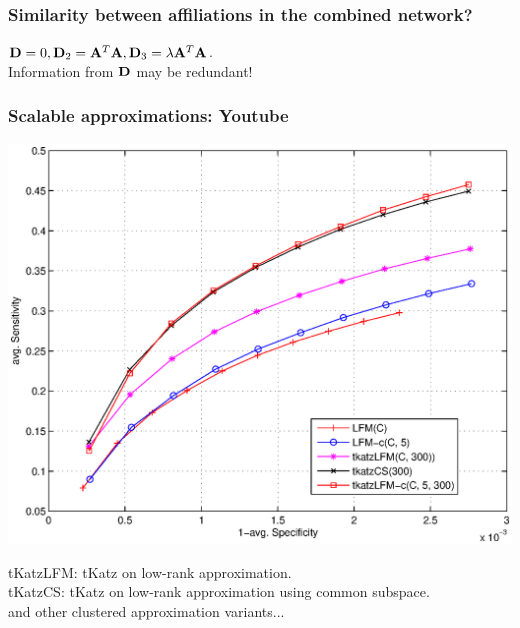 \documentclass[handout]{beamer}
\begin{document}
\begin{frame}
\frametitle{Similarity between affiliations in the combined network?}
\pause
{}
\pause
$\mathbf{D} = 0, \mathbf{D}_{2} = \mathbf{A}^{T}\mathbf{A}, \mathbf{D}_{3} = \lambda \mathbf{A}^{T}\mathbf{A}$. \\
\pause
Information from $\mathbf{D}$ may be redundant!
\end{frame}

\begin{frame}
\frametitle{Scalable approximations: Youtube}
\begin{center}
\includegraphics[scale=0.4]{../journalPaper/summarySVDKatzYoutube.eps}
\end{center}
\pause
\textsf{tKatzLFM}: \textsf{tKatz} on low-rank approximation.\\
\pause
\textsf{tKatzCS}: \textsf{tKatz} on low-rank approximation using common subspace.\\
\pause
and other clustered approximation variants...
\end{frame}
\end{document}
